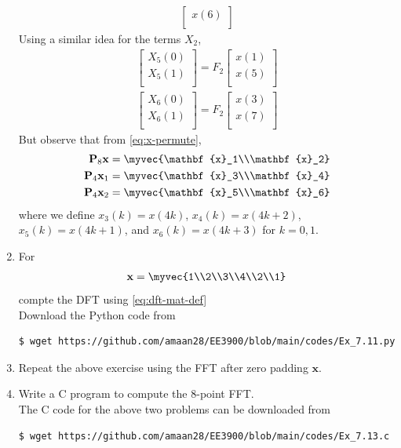 \documentclass[journal,12pt,twocolumn]{IEEEtran}
\let\vec\mathbf
\renewcommand\thesection{\arabic{section}}
\begin{document}
\begin{enumerate}[label=\thesection.\arabic*.,ref=\thesection.\theenumi]
\begin{align}
\begin{bmatrix}
	x(6) \\ 
\end{bmatrix}
\end{align}
Using a similar idea for the terms $X_2$, 
\begin{align}
\begin{bmatrix}
	X_{5}(0) \\ 
	X_{5}(1)\\ 
\end{bmatrix}
= F_{2}
\begin{bmatrix}
	x(1) \\ 
	x(5) \\ 
\end{bmatrix} \\
\begin{bmatrix}
	X_{6}(0) \\ 
	X_{6}(1)\\ 
\end{bmatrix}
= F_{2}
\begin{bmatrix}
	x(3) \\ 
	x(7) \\ 
\end{bmatrix}
\end{align}
But observe that from \eqref{eq:x-permute},
\begin{align}
\vec{P}_8\vec{x} &= \myvec{\vec{x}_1\\\vec{x}_2} \\
\vec{P}_4\vec{x}_1 &= \myvec{\vec{x}_3\\\vec{x}_4} \\ 
\vec{P}_4\vec{x}_2 &= \myvec{\vec{x}_5\\\vec{x}_6}
\end{align}
where we define $x_3(k) = x(4k)$, $x_4(k) = x(4k + 2)$, $x_5(k) = x(4k + 1)$, and $x_6(k) = x(4k + 3)$ for $k = 0, 1$.
\item For 
\begin{align}
\vec{x} = \myvec{1\\2\\3\\4\\2\\1}
\label{eq:equation1}
\end{align}
compte the DFT  
using 
\eqref{eq:dft-mat-def} \\
\solution Download the Python code from 
\begin{lstlisting}
$ wget https://github.com/amaan28/EE3900/blob/main/codes/Ex_7.11.py
\end{lstlisting}
\item Repeat the above exercise using the FFT
after zero padding $\vec{x}$.
\item Write a C program to compute the 8-point FFT. \\ 
\solution The C code for the above two problems can be downloaded from
\begin{lstlisting}
$ wget https://github.com/amaan28/EE3900/blob/main/codes/Ex_7.13.c
\end{lstlisting}
\end{enumerate}
\end{document}
